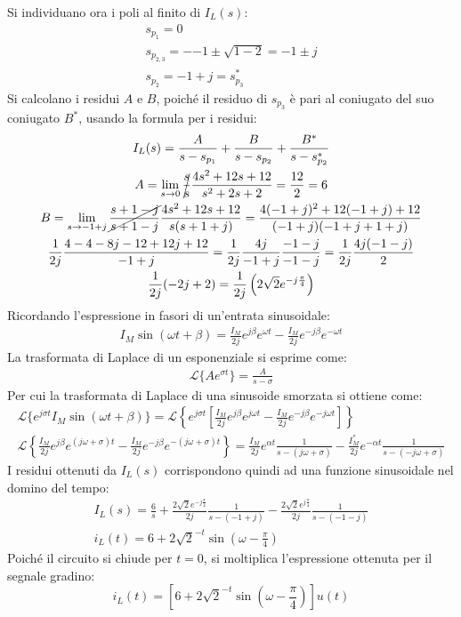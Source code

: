 \documentclass{article}
\begin{document}
Si individuano ora i poli al finito di $I_L(s)$:
\begin{gather*}
    s_{p_1}=0\\
    s_{p_{2,3}}=-{-1\pm\sqrt{1-2}}=-1\pm j\\
    s_{p_2}=-1+j=s_{p_3}^*
\end{gather*}
Si calcolano i residui $A$ e $B$, poiché il residuo di $s_{p_3}$ è pari al coniugato del suo coniugato $B^*$, usando la formula per i residui:
\begin{gather*}
    I_L(s)=\displaystyle\frac{A}{s-s_{p_1}}+\frac{B}{s-s_{p_2}}+\frac{B^*}{s-s_{p_2}^*}\\
    A=\lim_{s\to 0}\displaystyle\cancel{\frac{s}{s}}\frac{4s^2+12s+12}{s^2+2s+2}=\frac{12}{2}=6\\
    B=\lim_{s\to -1+j}\displaystyle\cancel{\frac{s+1-j}{s+1-j}}\frac{4s^2+12s+12}{s(s+1+j)}=\frac{4(-1+j)^2+12(-1+j)+12}{(-1+j)(-1+j+1+j)}\\
    \displaystyle\frac{1}{2j}\frac{4-4-8j-12+12j+12}{-1+j}=\frac{1}{2j}\frac{4j}{-1+j}\frac{-1-j}{-1-j}=\frac{1}{2j}\frac{4j(-1-j)}{2}\\    
    \displaystyle\frac{1}{2j}(-2j+2)=\frac{1}{2j}\left(2\sqrt{2}e^{-j\frac{\pi}{4}}\right)
\end{gather*}
Ricordando l'espressione in fasori di un'entrata sinusoidale:
\begin{gather*}
    I_M\sin(\omega t+\beta)=\displaystyle\frac{I_M}{2j}e^{j\beta}e^{\omega t}-\frac{I_M}{2j}e^{-j\beta}e^{-\omega t}
\end{gather*}
La trasformata di Laplace di un esponenziale si esprime come:
\begin{gather*}
    \mathcal{L}\{Ae^{\sigma t}\}=\displaystyle\frac{A}{s-\sigma}
\end{gather*}
Per cui la trasformata di Laplace di una sinusoide smorzata si ottiene come:
\begin{gather*}
    \mathcal{L}\{e^{j\sigma t}I_M\sin(\omega t+\beta)\}=\mathcal{L}\left\{e^{j\sigma t}\left[\displaystyle\frac{I_M}{2j}e^{j\beta}e^{j\omega t}-\frac{I_M}{2j}e^{-j\beta}e^{-j\omega t}\right]\right\}\\
    \mathcal{L}\left\{\displaystyle\frac{I_M}{2j}e^{j\beta}e^{(j\omega+\sigma) t}-\frac{I_M}{2j}e^{-j\beta}e^{-(j\omega+\sigma) t}\right\}=\frac{I_M}{2j}e^{\alpha t}\frac{1}{s-(j\omega +\sigma)}-\frac{I_M^*}{2j}e^{-\alpha t}\frac{1}{s-(-j\omega +\sigma)}
\end{gather*}
I residui ottenuti da $I_L(s)$ corrispondono quindi ad una funzione sinusoidale nel domino del tempo:
\begin{gather*}
    I_L(s)=\displaystyle\frac{6}{s}+\frac{2\sqrt{2}e^{-j\frac{\pi}{4}}}{2j}\frac{1}{s-(-1+j)}-\frac{2\sqrt{2}e^{j\frac{\pi}{4}}}{2j}\frac{1}{s-(-1-j)}\\
    i_L(t)=6+2\sqrt{2}^{-t}\sin\left(\omega-\displaystyle\frac{\pi}{4}\right)
\end{gather*}
Poiché il circuito si chiude per $t=0$, si moltiplica l'espressione ottenuta per il segnale gradino:
\begin{equation}
    i_L(t)=\left[6+2\sqrt{2}^{-t}\sin\left(\omega-\displaystyle\frac{\pi}{4}\right)\right]u(t)
\end{equation}
\end{document}
